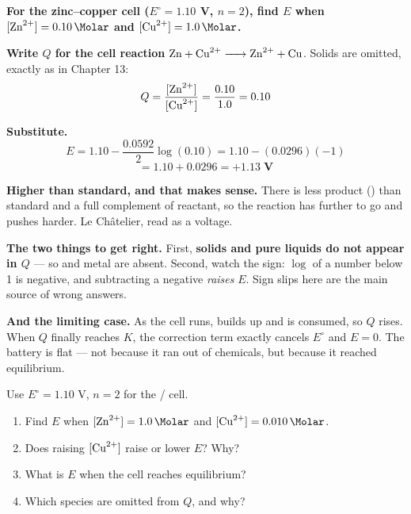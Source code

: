 \documentclass{apchem-worksheet}
\begin{document}
\begin{workedexample}
\textbf{For the zinc--copper cell ($E^{\circ} = 1.10$ V, $n = 2$), find
$E$ when $[\ce{Zn^2+}] = \SI{0.10}{\Molar}$ and $[\ce{Cu^2+}] =
\SI{1.0}{\Molar}$.}

\textbf{Write $Q$ for the cell reaction} $\ce{Zn + Cu^2+ -> Zn^2+ +
Cu}$. Solids are omitted, exactly as in Chapter 13:
\[ Q = \frac{[\ce{Zn^2+}]}{[\ce{Cu^2+}]}
     = \frac{0.10}{1.0} = 0.10 \]

\textbf{Substitute.}
\[ E = 1.10 - \frac{0.0592}{2}\log(0.10)
     = 1.10 - (0.0296)(-1) \]
\[ = 1.10 + 0.0296 = \mathbf{+1.13\;\text{V}} \]

\textbf{Higher than standard, and that makes sense.} There is less
product () than standard and a full complement of reactant, so
the reaction has further to go and pushes harder. Le Ch\^{a}telier, read
as a voltage.

\textbf{The two things to get right.} First, \textbf{solids and pure
liquids do not appear in $Q$} --- so  and  metal are
absent. Second, watch the sign: $\log$ of a number below 1 is negative,
and subtracting a negative \emph{raises} $E$. Sign slips here are the
main source of wrong answers.

\textbf{And the limiting case.} As the cell runs,  builds up
and  is consumed, so $Q$ rises. When $Q$ finally reaches $K$,
the correction term exactly cancels $E^{\circ}$ and $E = 0$. The battery
is flat --- not because it ran out of chemicals, but because it reached
equilibrium.
\end{workedexample}

\begin{yourturn}
Use $E^{\circ} = 1.10$ V, $n = 2$ for the / cell.
\begin{enumerate}[leftmargin=*,itemsep=0.5em]
  \item Find $E$ when $[\ce{Zn^2+}] = \SI{1.0}{\Molar}$ and
        $[\ce{Cu^2+}] = \SI{0.010}{\Molar}$. \workspace[2.2cm]
  \item Does raising $[\ce{Cu^2+}]$ raise or lower $E$? Why?
        \workspace[1.8cm]
  \item What is $E$ when the cell reaches equilibrium?
        \workspace[1.4cm]
  \item Which species are omitted from $Q$, and why?
        \workspace[1.6cm]
\end{enumerate}
\end{yourturn}
\end{document}
